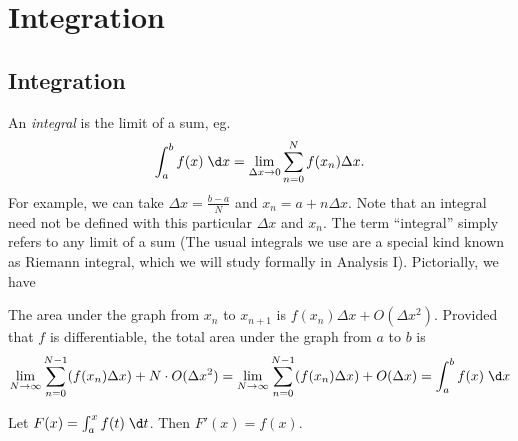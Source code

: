 \documentclass[a4paper]{article}
\begin{document}
\section{Integration}
\subsection{Integration}
\begin{defi}[Integral]
  An \emph{integral} is the limit of a sum, eg.
  \[
    \int_a^b f(x) \;\d x = \lim_{\Delta x\to 0}\sum_{n=0}^N f(x_n)\Delta x.
  \]
  For example, we can take $\Delta x=\frac{b - a}{N}$ and $x_n = a + n\Delta x$. Note that an integral need not be defined with this particular $\Delta x$ and $x_n$. The term ``integral'' simply refers to any limit of a sum (The usual integrals we use are a special kind known as Riemann integral, which we will study formally in Analysis I). Pictorially, we have
  \begin{center}
  \end{center}
\end{defi}

The area under the graph from $x_n$ to $x_{n+1}$ is $f(x_n)\Delta x + O(\Delta x^2)$. Provided that $f$ is differentiable, the total area under the graph from $a$ to $b$ is
\[
  \lim_{N\to \infty} \sum_{n=0}^{N-1}(f(x_n)\Delta x) + N\cdot O(\Delta x^2) = \lim_{N\to \infty} \sum_{n=0}^{N-1}(f(x_n)\Delta x) + O(\Delta x) = \int_a^b f(x)\;\d x
\]
\begin{thm}
  Let $F(x) = \int_a^x f(t)\;\d t$. Then $F'(x) = f(x)$.
\end{thm}
\end{document}
